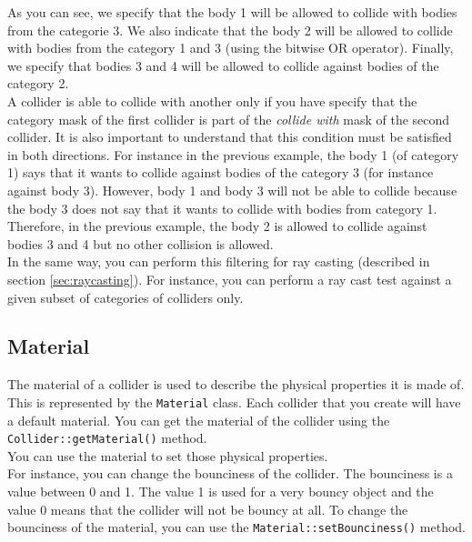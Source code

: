 \documentclass[a4paper,12pt]{article}
\begin{document}
    \vspace{0.6cm}

    As you can see, we specify that the body 1 will be allowed to collide with bodies from the categorie 3. We also indicate that the body 2 will be
    allowed to collide with bodies from the category 1 and 3 (using the bitwise OR operator). Finally, we specify that bodies 3 and 4 will be allowed
    to collide against bodies of the category 2. \\

    A collider is able to collide with another only if you have specify that the category mask of the first collider is part of the
    \emph{collide with} mask of the second collider. It is also important to understand that this condition must be satisfied in both directions. For
    instance in the previous example, the body 1 (of category 1) says that it wants to collide against bodies of the category 3 (for instance against
    body 3). However, body 1 and body 3 will not be able to collide because the body 3 does not say that it wants to collide
    with bodies from category 1. Therefore, in the previous example, the body 2 is allowed to collide against bodies 3 and 4 but no other collision
    is allowed. \\

    In the same way, you can perform this filtering for ray casting (described in section \ref{sec:raycasting}). For instance, you can perform a ray cast test
    against a given subset of categories of colliders only.

    \subsection{Material}
    \label{sec:material}

    The material of a collider is used to describe the physical properties it is made of. This is represented by the \texttt{Material} class. Each collider that you create will have a default material. You can get the material of the collider using the \texttt{Collider::\allowbreak getMaterial()} method. \\

    You can use the material to set those physical properties. \\

    For instance, you can change the bounciness of the collider. The bounciness is a value between 0 and 1. The value 1 is used for
    a very bouncy object and the value 0 means that the collider will not be bouncy at all. To change the bounciness of the material,
    you can use the \texttt{Material::\allowbreak setBounciness()} method. \\
\end{document}
